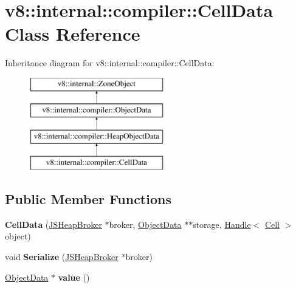 \hypertarget{classv8_1_1internal_1_1compiler_1_1CellData}{}\section{v8\+:\+:internal\+:\+:compiler\+:\+:Cell\+Data Class Reference}
\label{classv8_1_1internal_1_1compiler_1_1CellData}
Inheritance diagram for v8\+:\+:internal\+:\+:compiler\+:\+:Cell\+Data\+:\begin{figure}[H]
\begin{center}
\leavevmode
\includegraphics[height=4.000000cm]{classv8_1_1internal_1_1compiler_1_1CellData}
\end{center}
\end{figure}
\subsection*{Public Member Functions}
\begin{DoxyCompactItemize}
\item 
\mbox{\label{classv8_1_1internal_1_1compiler_1_1CellData_ac705d63719f68d3dcc5d3c22278b44a3}} 
{\bfseries Cell\+Data} (\mbox{\hyperlink{classv8_1_1internal_1_1compiler_1_1JSHeapBroker}{J\+S\+Heap\+Broker}} $\ast$broker, \mbox{\hyperlink{classv8_1_1internal_1_1compiler_1_1ObjectData}{Object\+Data}} $\ast$$\ast$storage, \mbox{\hyperlink{classv8_1_1internal_1_1Handle}{Handle}}$<$ \mbox{\hyperlink{classv8_1_1internal_1_1Cell}{Cell}} $>$ object)
\item 
\mbox{\label{classv8_1_1internal_1_1compiler_1_1CellData_a62b6785764990d81f7570fc401589e9d}} 
void {\bfseries Serialize} (\mbox{\hyperlink{classv8_1_1internal_1_1compiler_1_1JSHeapBroker}{J\+S\+Heap\+Broker}} $\ast$broker)
\item 
\mbox{\label{classv8_1_1internal_1_1compiler_1_1CellData_ada287fff045aa4639d7c85943869aed6}} 
\mbox{\hyperlink{classv8_1_1internal_1_1compiler_1_1ObjectData}{Object\+Data}} $\ast$ {\bfseries value} ()
\end{DoxyCompactItemize}
